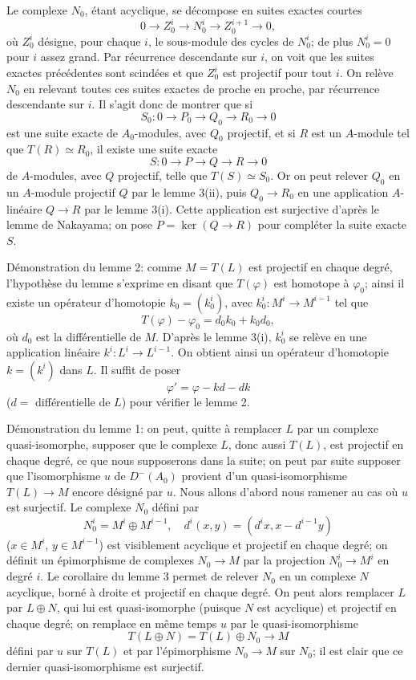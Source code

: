 \documentclass[11pt]{article}
\begin{document}
Le complexe $N_0$, étant acyclique, se décompose en suites exactes courtes
\[
0\longrightarrow Z_0^i\longrightarrow N_0^i\longrightarrow Z_0^{i+1}\longrightarrow0,
\]
où $Z_0^i$ désigne, pour chaque $i$, le sous-module des cycles de $N_0^i$; de plus $N_0^i=0$ pour $i$ assez grand. Par récurrence descendante sur $i$, on voit que les suites exactes précédentes sont scindées et que $Z_0^i$ est projectif pour tout $i$. On relève $N_0$ en relevant toutes ces suites exactes de proche en proche, par récurrence descendante sur $i$. Il s'agit donc de montrer que si
\[
S_0:0\longrightarrow P_0\longrightarrow Q_0\longrightarrow R_0\longrightarrow0
\]
est une suite exacte de $A_0$-modules, avec $Q_0$ projectif, et si $R$ est un $A$-module tel que $T(R)\simeq R_0$, il existe une suite exacte
\[
S:0\longrightarrow P\longrightarrow Q\longrightarrow R\longrightarrow0
\]
de $A$-modules, avec $Q$ projectif, telle que $T(S)\simeq S_0$. Or on peut relever $Q_0$ en un $A$-module projectif $Q$ par le lemme 3(ii), puis $Q_0\to R_0$ en une application $A$-linéaire $Q\to R$ par le lemme 3(i). Cette application est surjective d'après le lemme de Nakayama; on pose $P=\ker(Q\to R)$ pour compléter la suite exacte $S$.

Démonstration du lemme 2: comme $M=T(L)$ est projectif en chaque degré, l'hypothèse du lemme s'exprime en disant que $T(\varphi)$ est homotope à $\varphi_0$; ainsi il existe un opérateur d'homotopie $k_0=(k_0^i)$, avec $k_0^i:M^i\to M^{i-1}$ tel que
\[
T(\varphi)-\varphi_0=d_0k_0+k_0d_0,
\]
où $d_0$ est la différentielle de $M$. D'après le lemme 3(i), $k_0^i$ se relève en une application linéaire $k^i:L^i\to L^{i-1}$. On obtient ainsi un opérateur d'homotopie $k=(k^i)$ dans $L$. Il suffit de poser
\[
\varphi'=\varphi-kd-dk
\]
($d=$ différentielle de $L$) pour vérifier le lemme 2.

Démonstration du lemme 1: on peut, quitte à remplacer $L$ par un complexe quasi-isomorphe, supposer que le complexe $L$, donc aussi $T(L)$, est projectif en chaque degré, ce que nous supposerons dans la suite; on peut par suite supposer que l'isomorphisme $u$ de $D^-(A_0)$ provient d'un quasi-isomorphisme $T(L)\to M$ encore désigné par $u$. Nous allons d'abord nous ramener au cas où $u$ est surjectif. Le complexe $N_0$ défini par
\[
N_0^i=M^i\oplus M^{i-1},
\quad
 d^i(x,y)=(d^i x,x-d^{i-1}y)
\]
($x\in M^i$, $y\in M^{i-1}$) est visiblement acyclique et projectif en chaque degré; on définit un épimorphisme de complexes $N_0\to M$ par la projection $N_0^i\to M^i$ en degré $i$. Le corollaire du lemme 3 permet de relever $N_0$ en un complexe $N$ acyclique, borné à droite et projectif en chaque degré. On peut alors remplacer $L$ par $L\oplus N$, qui lui est quasi-isomorphe (puisque $N$ est acyclique) et projectif en chaque degré; on remplace en même temps $u$ par le quasi-isomorphisme
\[
T(L\oplus N)=T(L)\oplus N_0\longrightarrow M
\]
défini par $u$ sur $T(L)$ et par l'épimorphisme $N_0\to M$ sur $N_0$; il est clair que ce dernier quasi-isomorphisme est surjectif.
\end{document}
